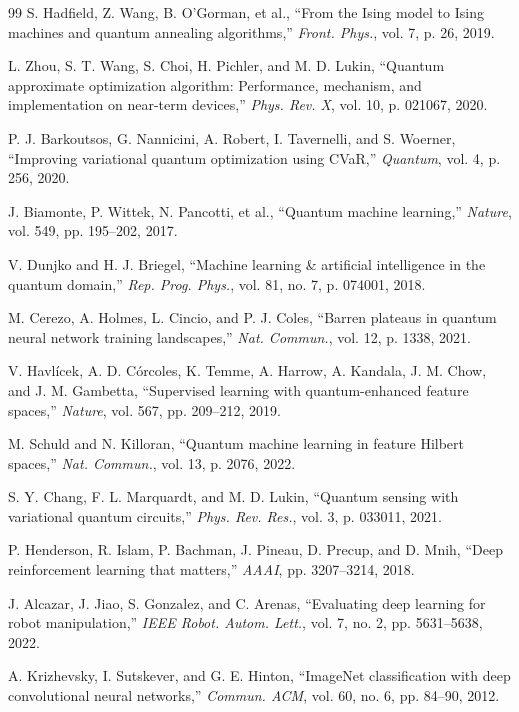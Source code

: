 \documentclass[journal]{IEEEtran}
\begin{document}
\begin{thebibliography}{99}
 S. Hadfield, Z. Wang, B. O'Gorman, et al., ``From the Ising model to Ising machines and quantum annealing algorithms,'' \textit{Front. Phys.}, vol. 7, p. 26, 2019.

 L. Zhou, S. T. Wang, S. Choi, H. Pichler, and M. D. Lukin, ``Quantum approximate optimization algorithm: Performance, mechanism, and implementation on near-term devices,'' \textit{Phys. Rev. X}, vol. 10, p. 021067, 2020.

 P. J. Barkoutsos, G. Nannicini, A. Robert, I. Tavernelli, and S. Woerner, ``Improving variational quantum optimization using CVaR,'' \textit{Quantum}, vol. 4, p. 256, 2020.

 J. Biamonte, P. Wittek, N. Pancotti, et al., ``Quantum machine learning,'' \textit{Nature}, vol. 549, pp. 195--202, 2017.

 V. Dunjko and H. J. Briegel, ``Machine learning \& artificial intelligence in the quantum domain,'' \textit{Rep. Prog. Phys.}, vol. 81, no. 7, p. 074001, 2018.

 M. Cerezo, A. Holmes, L. Cincio, and P. J. Coles, ``Barren plateaus in quantum neural network training landscapes,'' \textit{Nat. Commun.}, vol. 12, p. 1338, 2021.

 V. Havl\'icek, A. D. C\'orcoles, K. Temme, A. Harrow, A. Kandala, J. M. Chow, and J. M. Gambetta, ``Supervised learning with quantum-enhanced feature spaces,'' \textit{Nature}, vol. 567, pp. 209--212, 2019.

 M. Schuld and N. Killoran, ``Quantum machine learning in feature Hilbert spaces,'' \textit{Nat. Commun.}, vol. 13, p. 2076, 2022.

 S. Y. Chang, F. L. Marquardt, and M. D. Lukin, ``Quantum sensing with variational quantum circuits,'' \textit{Phys. Rev. Res.}, vol. 3, p. 033011, 2021.

 P. Henderson, R. Islam, P. Bachman, J. Pineau, D. Precup, and D. Mnih, ``Deep reinforcement learning that matters,'' \textit{AAAI}, pp. 3207--3214, 2018.

 J. Alcazar, J. Jiao, S. Gonzalez, and C. Arenas, ``Evaluating deep learning for robot manipulation,'' \textit{IEEE Robot. Autom. Lett.}, vol. 7, no. 2, pp. 5631--5638, 2022.

 A. Krizhevsky, I. Sutskever, and G. E. Hinton, ``ImageNet classification with deep convolutional neural networks,'' \textit{Commun. ACM}, vol. 60, no. 6, pp. 84--90, 2012.


\end{thebibliography}
\end{document}
